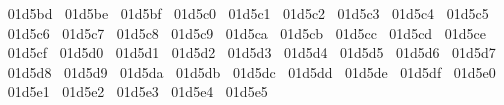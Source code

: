 {  ^^^^^^01d5bd%
  ^^^^^^01d5be%
  ^^^^^^01d5bf%
  ^^^^^^01d5c0%
  ^^^^^^01d5c1%
  ^^^^^^01d5c2%
  ^^^^^^01d5c3%
  ^^^^^^01d5c4%
  ^^^^^^01d5c5%
  ^^^^^^01d5c6%
  ^^^^^^01d5c7%
  ^^^^^^01d5c8%
  ^^^^^^01d5c9%
  ^^^^^^01d5ca%
  ^^^^^^01d5cb%
  ^^^^^^01d5cc%
  ^^^^^^01d5cd%
  ^^^^^^01d5ce%
  ^^^^^^01d5cf%
  ^^^^^^01d5d0%
  ^^^^^^01d5d1%
  ^^^^^^01d5d2%
  ^^^^^^01d5d3%
  ^^^^^^01d5d4%
  ^^^^^^01d5d5%
  ^^^^^^01d5d6%
  ^^^^^^01d5d7%
  ^^^^^^01d5d8%
  ^^^^^^01d5d9%
  ^^^^^^01d5da%
  ^^^^^^01d5db%
  ^^^^^^01d5dc%
  ^^^^^^01d5dd%
  ^^^^^^01d5de%
  ^^^^^^01d5df%
  ^^^^^^01d5e0%
  ^^^^^^01d5e1%
  ^^^^^^01d5e2%
  ^^^^^^01d5e3%
  ^^^^^^01d5e4%
  ^^^^^^01d5e5%
}

